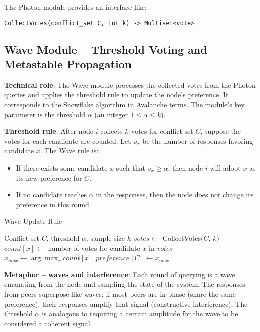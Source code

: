 The Photon module provides an interface like:
\begin{lstlisting}
CollectVotes(conflict_set C, int k) -> Multiset<vote>
\end{lstlisting}

\subsection{Wave Module – Threshold Voting and Metastable Propagation}

\textbf{Technical role}: The Wave module processes the collected votes from the Photon queries and applies the threshold rule to update the node's preference. It corresponds to the Snowflake algorithm in Avalanche terms. The module's key parameter is the threshold $\alpha$ (an integer $1 \le \alpha \le k$).

\textbf{Threshold rule}: After node $i$ collects $k$ votes for conflict set $C$, suppose the votes for each candidate are counted. Let $v_x$ be the number of responses favoring candidate $x$. The Wave rule is:

\begin{itemize}
\item If there exists some candidate $x$ such that $v_x \ge \alpha$, then node $i$ will adopt $x$ as its new preference for $C$.
\item If no candidate reaches $\alpha$ in the responses, then the node does not change its preference in this round.
\end{itemize}

\begin{algorithm}
\caption{Wave Update Rule}
\begin{algorithmic}[1]
\REQUIRE Conflict set $C$, threshold $\alpha$, sample size $k$
\STATE $votes \leftarrow$ CollectVotes($C$, $k$)
\STATE $count[x] \leftarrow$ number of votes for candidate $x$ in $votes$
\STATE $x_{max} \leftarrow \arg\max_x count[x]$
    \STATE $preference[C] \leftarrow x_{max}$
\ENDIF
\end{algorithmic}
\end{algorithm}

\textbf{Metaphor – waves and interference}: Each round of querying is a wave emanating from the node and sampling the state of the system. The responses from peers superpose like waves: if most peers are in phase (share the same preference), their responses amplify that signal (constructive interference). The threshold $\alpha$ is analogous to requiring a certain amplitude for the wave to be considered a coherent signal.

